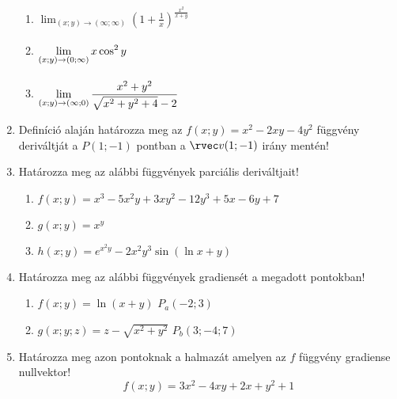 \documentclass[a4paper, 12pt, fleqn]{scrartcl}
\begin{document}
\begin{enumerate}
\begin{multicols}{2}
\begin{enumerate}
            \item $\displaystyle
                    \lim_{(x; y) \to (\infty; \infty)}
                    \left(1 + \frac{1}{x}\right)^{\frac{x^2}{x + y}}
                  $

            \item $\displaystyle
                    \lim_{(x; y) \to (0; \infty)} \vphantom{\frac12}
                    x \cos^2 y
                  $

            \item $\displaystyle
                    \lim_{(x; y) \to (\infty; 0)}
                    \frac{x^2 + y^2}{\sqrt{x^2 + y^2 + 4} - 2}^{\vphantom{\frac12}}
                  $
          \end{enumerate}
        \end{multicols}

  \item Definíció alaján határozza meg az $f(x; y) = x^2 - 2xy - 4y^2$
        függvény deriváltját a $P(1; -1)$ pontban a $\rvec v(1; -1)$
        irány mentén!

  \item Határozza meg az alábbi függvények parciális deriváltjait!
        \begin{enumerate}
          \item $f(x; y) = x^3 - 5x^2y + 3xy^2 - 12y^3 + 5x - 6y + 7$
          \item $g(x; y) = x^y$
          \item $h(x; y) = e^{x^2y} - 2x^2y^3\sin(\ln x + y)$
        \end{enumerate}

  \item Határozza meg az alábbi függvények gradiensét a megadott pontokban!
        \begin{enumerate}
          \item $f(x; y) = \ln\left(x+y\right)$
                \tabto{7cm} $P_a(-2; 3)$

          \item $g(x; y; z) = z-\sqrt{x^2+y^2}$
                \tabto{7cm} $P_b(3; -4; 7)$
        \end{enumerate}

  \item Határozza meg azon pontoknak a halmazát amelyen az $f$
        függvény gradiense nullvektor!
        \begin{equation*}
          f(x; y)=3x^2-4xy+2x+y^2+1
        \end{equation*}
\end{enumerate}
\end{document}
